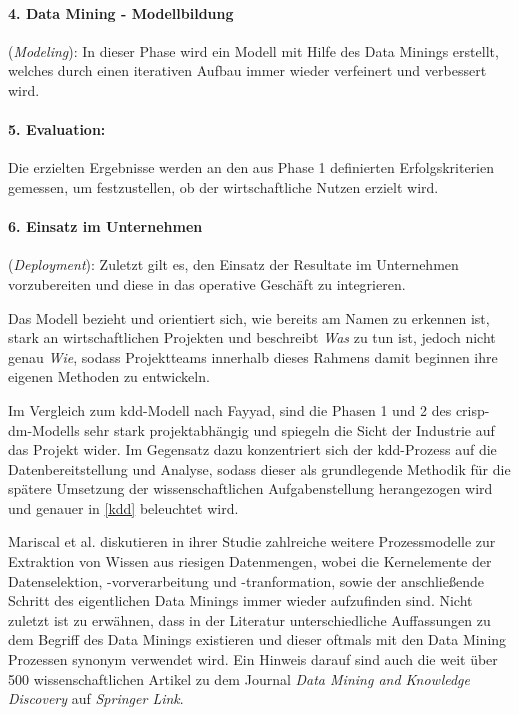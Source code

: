 \paragraph{4. Data Mining - Modellbildung}(\textit{Modeling}): 
In dieser Phase wird ein Modell mit Hilfe des Data Minings erstellt, welches durch einen iterativen Aufbau immer wieder verfeinert und verbessert wird. 
\paragraph{5. Evaluation:}
Die erzielten Ergebnisse werden an den aus Phase 1 definierten Erfolgskriterien gemessen, um festzustellen, ob der wirtschaftliche Nutzen erzielt wird.
\paragraph{6. Einsatz im Unternehmen}(\textit{Deployment}): 
Zuletzt gilt es, den Einsatz der Resultate im Unternehmen vorzubereiten und diese in das operative Geschäft zu integrieren.

Das Modell bezieht und orientiert sich, wie bereits am Namen zu erkennen ist, stark an wirtschaftlichen Projekten und beschreibt \textit{Was} zu tun ist, jedoch nicht genau \textit{Wie}, sodass Projektteams innerhalb dieses Rahmens damit beginnen ihre eigenen Methoden zu entwickeln.

Im Vergleich zum \gls{kdd}-Modell nach Fayyad, sind die Phasen 1 und 2 des \gls{crisp-dm}-Modells sehr stark projektabhängig und spiegeln die Sicht der Industrie auf das Projekt wider. Im Gegensatz dazu konzentriert sich der \gls{kdd}-Prozess auf die Datenbereitstellung und Analyse, sodass dieser als grundlegende Methodik für die spätere Umsetzung der wissenschaftlichen Aufgabenstellung herangezogen wird und genauer in \vref{kdd} beleuchtet wird.

Mariscal et al. diskutieren in ihrer Studie zahlreiche weitere Prozessmodelle zur Extraktion von Wissen aus riesigen Datenmengen, wobei die Kernelemente der Datenselektion, -vorverarbeitung und -tranformation, sowie der anschließende Schritt des eigentlichen Data Minings immer wieder aufzufinden sind. Nicht zuletzt ist zu erwähnen, dass in der Literatur unterschiedliche Auffassungen zu dem Begriff des Data Minings existieren und dieser oftmals mit den Data Mining Prozessen synonym verwendet wird. Ein Hinweis darauf sind auch die weit über 500 wissenschaftlichen Artikel zu dem Journal \textit{Data Mining and Knowledge Discovery} auf \textit{Springer Link}.

